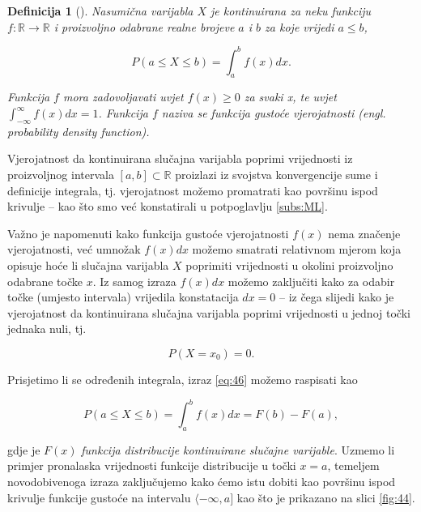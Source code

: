 \documentclass[a4paper,12pt,oneside]{memoir}
\newtheorem{definition}{Definicija}[chapter]
\begin{document}
                \begin{definition}[\cite{Dekking}]
                    Nasumična varijabla $X$ je kontinuirana za neku funkciju $f:\mathbb{R}\to \mathbb{R}$ i proizvoljno odabrane realne brojeve $a$ i $b$ za koje vrijedi $a\leq b$,

                    \begin{equation}
                        P(a\leq X\leq b)=\displaystyle\int_{a}^{b}f(x)dx.
                        \label{eq:46}
                    \end{equation}

                    Funkcija $f$ mora zadovoljavati uvjet $f(x)\geq 0$ za svaki x, te uvjet $\int_{-\infty}^{\infty}f(x)dx=1$. Funkcija $f$ naziva se funkcija gustoće vjerojatnosti (engl. probability density function).
                \end{definition}

                Vjerojatnost da kontinuirana slučajna varijabla poprimi vrijednosti iz proizvoljnog intervala $\left[a,b\right]\subset\mathbb{R}$ proizlazi iz svojstva konvergencije sume i definicije integrala, tj. vjerojatnost možemo promatrati kao površinu ispod krivulje -- kao što smo već konstatirali u potpoglavlju \ref{subs:ML}.

                Važno je napomenuti kako funkcija gustoće vjerojatnosti $f(x)$ nema značenje vjerojatnosti, već umnožak $f(x)dx$ možemo smatrati relativnom mjerom koja opisuje hoće li slučajna varijabla $X$ poprimiti vrijednosti u okolini proizvoljno odabrane točke $x$. Iz samog izraza $f(x)dx$ možemo zaključiti kako za odabir točke (umjesto intervala) vrijedila konstatacija $dx=0$ -- iz čega slijedi kako je vjerojatnost da kontinuirana slučajna varijabla poprimi vrijednosti u jednoj točki jednaka nuli, tj.

                \begin{equation}
                    P(X=x_0)=0.                    
                \end{equation}
                
                Prisjetimo li se određenih integrala, izraz \ref{eq:46} možemo raspisati kao

                \begin{equation}
                    P(a\leq X\leq b)=\displaystyle\int_{a}^{b}f(x)dx=F(b)-F(a),
                \end{equation}
                
                gdje je $F(x)$ \textit{funkcija distribucije kontinuirane slučajne varijable}. Uzmemo li primjer pronalaska vrijednosti funkcije distribucije u točki $x=a$, temeljem novodobivenoga izraza zaključujemo kako ćemo istu dobiti kao površinu ispod krivulje funkcije gustoće na intervalu $\langle-\infty,a]$ kao što je prikazano na slici \ref{fig:44}.
\end{document}
